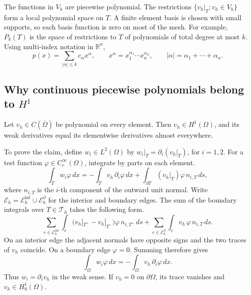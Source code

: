 \documentclass[11pt,a4paper]{article}
\begin{document}
\begin{center}
\end{center}

The functions in \(V_h\) are piecewise polynomial. The restrictions
\(\{v_h|_T:v_h\in V_h\}\) form a local polynomial space on \(T\).
A finite element basis is chosen with small supports, so each basis
function is zero on most of the mesh. For example, \(P_k(T)\) is the space
of restrictions to \(T\) of polynomials of total degree at most \(k\).
Using multi-index notation in \(\mathbb R^n\),
\[
 p(x)=\sum_{|\alpha|\leq k} c_\alpha x^\alpha,\qquad
 x^\alpha=x_1^{\alpha_1}\cdots x_n^{\alpha_n},\qquad
 |\alpha|=\alpha_1+\cdots+\alpha_n .
\]

\subsection{Why continuous piecewise polynomials belong to \(H^1\)}

Let \(v_h\in C(\overline\Omega)\) be polynomial on every element.
Then \(v_h\in H^1(\Omega)\), and its weak derivatives equal its
elementwise derivatives almost everywhere.

To prove the claim, define \(w_i\in L^2(\Omega)\) by
\(w_i|_T=\partial_i(v_h|_T)\), for \(i=1,2\). For a test function
\(\varphi\in C_c^\infty(\Omega)\), integrate by parts on each element.
\[
 \int_T w_i\varphi\,dx
 =-\int_T v_h\,\partial_i\varphi\,dx
   +\int_{\partial T}(v_h|_T)\varphi\,n_{i,T}\,ds,
\]
where \(n_{i,T}\) is the \(i\)-th component of the outward unit normal.
Write \(\mathcal E_h=\mathcal E_h^{\mathrm{int}}\cup\mathcal E_h^\partial\)
for the interior and boundary edges. The sum of the boundary integrals
over \(T\in\mathcal T_h\) takes the following form.
\[
 \sum_{e\in\mathcal E_h^{\mathrm{int}}}
 \int_e \bigl(v_h|_{T^+}-v_h|_{T^-}\bigr)\varphi\,n_{i,T^+}\,ds
 +\sum_{e\in\mathcal E_h^\partial}
 \int_e v_h\,\varphi\,n_{i,T}\,ds .
\]
On an interior edge the adjacent normals have opposite signs and the
two traces of \(v_h\) coincide. On a boundary edge \(\varphi=0\).
Summing therefore gives
\[
 \int_\Omega w_i\varphi\,dx=-\int_\Omega v_h\,\partial_i\varphi\,dx.
\]
Thus \(w_i=\partial_i v_h\) in the weak sense. If \(v_h=0\) on
\(\partial\Omega\), its trace vanishes and \(v_h\in H_0^1(\Omega)\).
\end{document}
